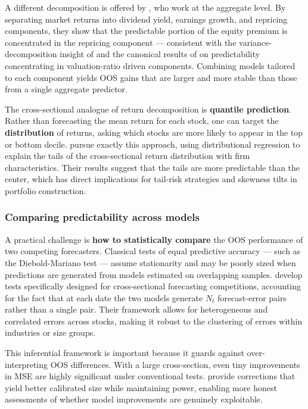 A different decomposition is offered by \cite{lin2025market}, who work at the aggregate level. By separating market returns into dividend yield, earnings growth, and repricing components, they show that the predictable portion of the equity premium is concentrated in the repricing component --- consistent with the variance-decomposition insight of \cite{campbell2008predicting} and the canonical results of \cite{goyal2008comprehensive} on predictability concentrating in valuation-ratio driven components. Combining models tailored to each component yields OOS gains that are larger and more stable than those from a single aggregate predictor.

The cross-sectional analogue of return decomposition is \textbf{quantile prediction}. Rather than forecasting the mean return for each stock, one can target the \textbf{distribution} of returns, asking which stocks are more likely to appear in the top or bottom decile. \cite{uribe2025moving} pursue exactly this approach, using distributional regression to explain the tails of the cross-sectional return distribution with firm characteristics. Their results suggest that the tails are more predictable than the center, which has direct implications for tail-risk strategies and skewness tilts in portfolio construction.

\subsubsection{Comparing predictability across models}

A practical challenge is \textbf{how to statistically compare} the OOS performance of two competing forecasters. Classical tests of equal predictive accuracy --- such as the Diebold-Mariano test --- assume stationarity and may be poorly sized when predictions are generated from models estimated on overlapping samples. \cite{qu2023comparing} develop tests specifically designed for cross-sectional forecasting competitions, accounting for the fact that at each date the two models generate $N_t$ forecast-error pairs rather than a single pair. Their framework allows for heterogeneous and correlated errors across stocks, making it robust to the clustering of errors within industries or size groups.

This inferential framework is important because it guards against over-interpreting OOS differences. With a large cross-section, even tiny improvements in MSE are highly significant under conventional tests. \cite{qu2023comparing} provide corrections that yield better calibrated size while maintaining power, enabling more honest assessments of whether model improvements are genuinely exploitable.

